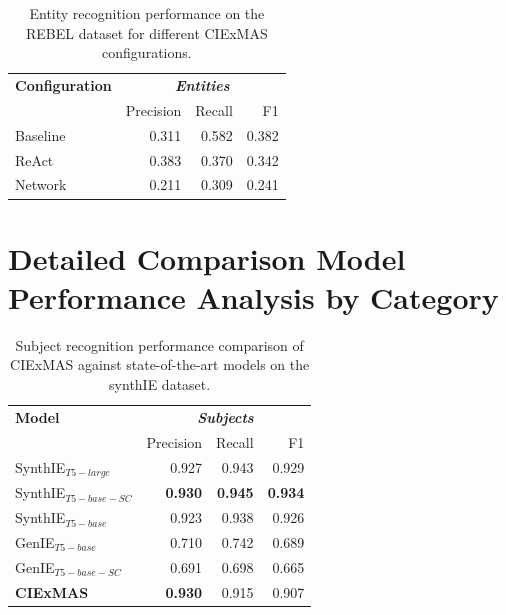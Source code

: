\documentclass[a4paper,oneside,bibliography=totoc]{scrbook}
\begin{document}
\begin{table}[h]
  \centering
  \begin{tabular}{l|rrr}
    \toprule
    \textbf{Configuration} & \multicolumn{3}{c}{\textit{\textbf{Entities}}}                  \\
                           & Precision                                      & Recall & F1    \\
    \midrule
    Baseline               & 0.311                                          & 0.582  & 0.382 \\
    {\ac{ReAct}}           & 0.383                                          & 0.370  & 0.342 \\
    Network                & 0.211                                          & 0.309  & 0.241 \\
    \bottomrule
  \end{tabular}
  \caption{Entity recognition performance on the REBEL dataset for different CIExMAS configurations.}
  \label{tab:rebel_entities}
\end{table}

\newpage

\section{Detailed Comparison Model Performance Analysis by Category}
\label{sec:evaluation_results_by_category}

\begin{table}[h]
  \centering
  \begin{tabular}{l|rrr}
    \toprule
    \textbf{Model}         & \multicolumn{3}{c}{\textit{\textbf{Subjects}}}                                   \\
                           & Precision                                      & Recall         & F1             \\
    \midrule
    SynthIE$_{T5-large}$   & 0.927                                          & 0.943          & 0.929          \\
    SynthIE$_{T5-base-SC}$ & \textbf{0.930}                                 & \textbf{0.945} & \textbf{0.934} \\
    SynthIE$_{T5-base}$    & 0.923                                          & 0.938          & 0.926          \\
    GenIE$_{T5-base}$      & 0.710                                          & 0.742          & 0.689          \\
    GenIE$_{T5-base-SC}$   & 0.691                                          & 0.698          & 0.665          \\
    \midrule
    \textbf{CIExMAS}       & \textbf{0.930}                                 & 0.915          & 0.907          \\
    \bottomrule
  \end{tabular}
  \caption{Subject recognition performance comparison of CIExMAS against state-of-the-art models on the synthIE dataset.}
  \label{tab:evaluation_subjects}
\end{table}
\end{document}
